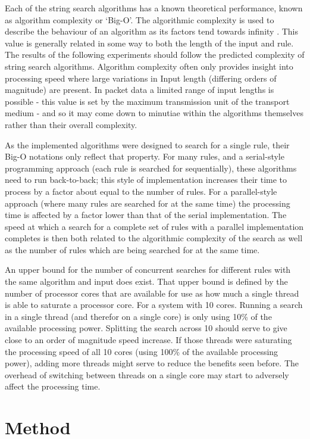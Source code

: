 \documentclass[9pt, conference]{IEEEtran}
\begin{document}
Each of the string search algorithms has a known theoretical performance, known as algorithm complexity or  `Big-O'. The algorithmic complexity is used to describe the behaviour of an algorithm as its factors tend towards infinity \citep{bachman1894, landau1909}. This value is generally related in some way to both the length of the input and rule. The results of the following experiments should follow the predicted complexity of string search algorithms. Algorithm complexity often only provides insight into processing speed where large variations in Input length (differing orders of magnitude) are present. In packet data a limited range of input lengths is possible - this value is set by the maximum transmission unit of the transport medium - and so it may come down to minutiae within the algorithms themselves rather than their overall complexity.

As the implemented algorithms were designed to search for a single rule, their Big-O notations only reflect that property. For many rules, and a serial-style programming approach (each rule is searched for sequentially), these algorithms need to run back-to-back; this style of implementation increases their time to process by a factor about equal to the number of rules. For a parallel-style approach (where many rules are searched for at the same time) the processing time is affected by a factor lower than that of the serial implementation. The speed at which a search for a complete set of rules with a parallel implementation completes is then both related to the algorithmic complexity of the search as well as the number of rules which are being searched for at the same time.

An upper bound for the number of concurrent searches for different rules with the same algorithm and input does exist. That upper bound is defined by the number of processor cores that are available for use as how much a single thread is able to saturate a processor core.
For a system with 10 cores. Running a search in a single thread (and therefor on a single core) is only using 10\% of the available processing power. Splitting the search across 10 should serve to give close to an order of magnitude speed increase. If those threads were saturating the processing speed of all 10 cores (using 100\% of the available processing power), adding more threads might serve to reduce the benefits seen before. The overhead of switching between threads on a single core may start to adversely affect the processing time.

\section{Method}
\end{document}
